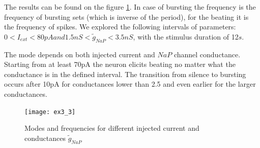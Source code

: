 \documentclass[a4paper,11pt]{article} %
\begin{document}
The results can be found on the figure \ref{fig:modes}. In case of bursting
the frequency is the frequency of bursting sets (which is inverse of the period),
for the beating it is the frequency of spikes. We explored the following intervals of
parameters: $0 < I_{ext} < 80pA and 1.5nS < \tilde{g}_{NaP} < 3.5nS$, with
the stimulus duration of 12$s$.

The mode depends on both injected current and $NaP$ channel conductance.
Starting from at least 70pA the neuron elicits beating no matter what the conductance is
in the defined interval. The transition from silence to bursting occurs after 10pA
for conductances lower than 2.5 and even earlier for the larger conductances.

\begin{figure}[H]
    \centering
    \texttt{[image: ex3\_3]}
    \caption{Modes and frequencies for different injected current and conductances $\tilde{g}_{NaP}$}
    \label{fig:modes}
\end{figure}
\end{document}
